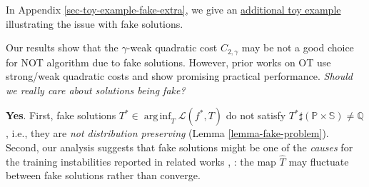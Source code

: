 \documentclass{article} %
\DeclareMathOperator*{\arginf}{arg\,inf}
\begin{document}
In Appendix \ref{sec-toy-example-fake-extra}, we give an \underline{additional toy example} illustrating the issue with fake solutions.


\vspace{-0.5mm}Our results show that the $\gamma$-weak quadratic cost $C_{2,\gamma}$ may be not a good choice for NOT algorithm due to fake solutions.
However, prior works on OT \citep{korotin2023neural,rout2022generative,fan2022scalable,gazdieva2022optimal,korotin2022wasserstein} use strong/weak quadratic costs and show promising practical performance. \textit{Should we really care about solutions being fake?}

\vspace{-0.5mm}\textbf{Yes}. First, fake solutions $T^{*}\in\arginf_{T}\mathcal{L}(f^{*},T)$ do not satisfy $T^{*}\sharp(\mathbb{P}\!\times\!\mathbb{S})\neq \mathbb{Q}$, i.e., they are \textit{not distribution preserving} (Lemma \ref{lemma-fake-problem}). Second, our analysis suggests that fake solutions might be one of the \textit{causes} for the training instabilities reported in related works \citep[Appendix D]{korotin2023neural}, \citep[]{korotin2021neural}: the map $\widehat{T}$ may fluctuate between fake solutions rather than converge. 
    
    
    
\end{document}
